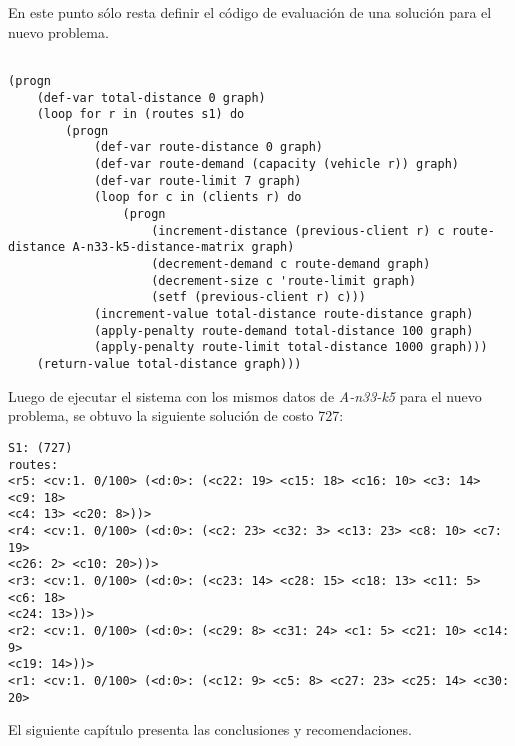 En este punto sólo resta definir el código de evaluación de una solución para el nuevo problema.

\begin{lstlisting}

(progn
	(def-var total-distance 0 graph)
	(loop for r in (routes s1) do 
		(progn
			(def-var route-distance 0 graph)
			(def-var route-demand (capacity (vehicle r)) graph) 
			(def-var route-limit 7 graph)
			(loop for c in (clients r) do 
				(progn
					(increment-distance (previous-client r) c route-distance A-n33-k5-distance-matrix graph)
					(decrement-demand c route-demand graph) 
					(decrement-size c 'route-limit graph) 
					(setf (previous-client r) c)))
			(increment-value total-distance route-distance graph)
			(apply-penalty route-demand total-distance 100 graph) 
			(apply-penalty route-limit total-distance 1000 graph))) 
	(return-value total-distance graph)))
\end{lstlisting}

Luego de ejecutar el sistema con los mismos datos de \textit{A-n33-k5} para el nuevo problema, se obtuvo la siguiente solución de costo 727:

\begin{lstlisting}
S1: (727)
routes:
<r5: <cv:1. 0/100> (<d:0>: (<c22: 19> <c15: 18> <c16: 10> <c3: 14> <c9: 18>
<c4: 13> <c20: 8>))>
<r4: <cv:1. 0/100> (<d:0>: (<c2: 23> <c32: 3> <c13: 23> <c8: 10> <c7: 19>
<c26: 2> <c10: 20>))>
<r3: <cv:1. 0/100> (<d:0>: (<c23: 14> <c28: 15> <c18: 13> <c11: 5> <c6: 18>
<c24: 13>))>
<r2: <cv:1. 0/100> (<d:0>: (<c29: 8> <c31: 24> <c1: 5> <c21: 10> <c14: 9>
<c19: 14>))>
<r1: <cv:1. 0/100> (<d:0>: (<c12: 9> <c5: 8> <c27: 23> <c25: 14> <c30: 20>
\end{lstlisting}

El siguiente capítulo presenta las conclusiones y recomendaciones.